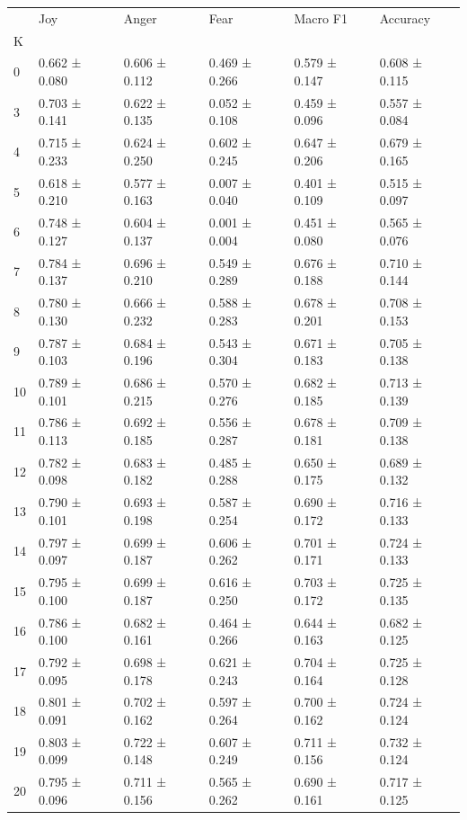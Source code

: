 \begin{tabular}{llllll}
\toprule
 & Joy & Anger & Fear & Macro F1 & Accuracy \\
K &  &  &  &  &  \\
\midrule
0 & 0.662 ± 0.080 & 0.606 ± 0.112 & 0.469 ± 0.266 & 0.579 ± 0.147 & 0.608 ± 0.115 \\
3 & 0.703 ± 0.141 & 0.622 ± 0.135 & 0.052 ± 0.108 & 0.459 ± 0.096 & 0.557 ± 0.084 \\
4 & 0.715 ± 0.233 & 0.624 ± 0.250 & 0.602 ± 0.245 & 0.647 ± 0.206 & 0.679 ± 0.165 \\
5 & 0.618 ± 0.210 & 0.577 ± 0.163 & 0.007 ± 0.040 & 0.401 ± 0.109 & 0.515 ± 0.097 \\
6 & 0.748 ± 0.127 & 0.604 ± 0.137 & 0.001 ± 0.004 & 0.451 ± 0.080 & 0.565 ± 0.076 \\
7 & 0.784 ± 0.137 & 0.696 ± 0.210 & 0.549 ± 0.289 & 0.676 ± 0.188 & 0.710 ± 0.144 \\
8 & 0.780 ± 0.130 & 0.666 ± 0.232 & 0.588 ± 0.283 & 0.678 ± 0.201 & 0.708 ± 0.153 \\
9 & 0.787 ± 0.103 & 0.684 ± 0.196 & 0.543 ± 0.304 & 0.671 ± 0.183 & 0.705 ± 0.138 \\
10 & 0.789 ± 0.101 & 0.686 ± 0.215 & 0.570 ± 0.276 & 0.682 ± 0.185 & 0.713 ± 0.139 \\
11 & 0.786 ± 0.113 & 0.692 ± 0.185 & 0.556 ± 0.287 & 0.678 ± 0.181 & 0.709 ± 0.138 \\
12 & 0.782 ± 0.098 & 0.683 ± 0.182 & 0.485 ± 0.288 & 0.650 ± 0.175 & 0.689 ± 0.132 \\
13 & 0.790 ± 0.101 & 0.693 ± 0.198 & 0.587 ± 0.254 & 0.690 ± 0.172 & 0.716 ± 0.133 \\
14 & 0.797 ± 0.097 & 0.699 ± 0.187 & 0.606 ± 0.262 & 0.701 ± 0.171 & 0.724 ± 0.133 \\
15 & 0.795 ± 0.100 & 0.699 ± 0.187 & 0.616 ± 0.250 & 0.703 ± 0.172 & 0.725 ± 0.135 \\
16 & 0.786 ± 0.100 & 0.682 ± 0.161 & 0.464 ± 0.266 & 0.644 ± 0.163 & 0.682 ± 0.125 \\
17 & 0.792 ± 0.095 & 0.698 ± 0.178 & 0.621 ± 0.243 & 0.704 ± 0.164 & 0.725 ± 0.128 \\
18 & 0.801 ± 0.091 & 0.702 ± 0.162 & 0.597 ± 0.264 & 0.700 ± 0.162 & 0.724 ± 0.124 \\
19 & 0.803 ± 0.099 & 0.722 ± 0.148 & 0.607 ± 0.249 & 0.711 ± 0.156 & 0.732 ± 0.124 \\
20 & 0.795 ± 0.096 & 0.711 ± 0.156 & 0.565 ± 0.262 & 0.690 ± 0.161 & 0.717 ± 0.125 \\

\end{tabular}
